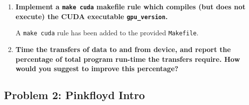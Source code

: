\begin{enumerate}
This means that each thread only needs to calculate the complement of a single 64-bit integer. Reapplying the \textit{CUDA Occupancy Calculator} with the updated values gives an estimated occupancy each \ac{SM} of 100\%. The results from running the second program is shown in Figure~\ref{figure:lenna_2}.

\begin{itemize}
\item Compute capability: 2.1
\item Shared memory size: 49152 bytes
\item Threads per block: 256
\item Registers per thread: 6
\item Shared memory per block: 0
\end{itemize}

The second approach shows an improvement from approximately 110~us to 82~us for the kernel execution time.

\begin{figure}
\caption{Lenna program \#2 -- 384 blocks of 256 threads}
\label{figure:lenna_2}
\end{figure}

\item \textbf{Implement a \texttt{make cuda} makefile rule which compiles (but does not execute) the CUDA executable \texttt{gpu\_version}.}

A \texttt{make cuda} rule has been added to the provided \texttt{Makefile}.

\item \textbf{Time the transfers of data to and from device, and report the percentage of total program run-time the transfers require. How would you suggest to improve this percentage?}

\end{enumerate}

\subsection*{Problem 2: Pinkfloyd Intro}



